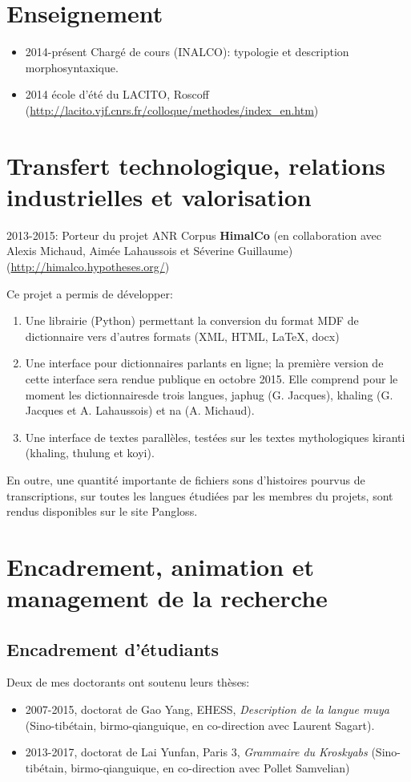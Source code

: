 \documentclass[oldfontcommands,oneside,a4paper,11pt]{article}
\begin{document}
\section{Enseignement}
\begin{itemize}
\item 2014-présent Chargé de cours (INALCO): typologie et description morphosyntaxique.
\item 2014 école d'été du LACITO, Roscoff (\url{http://lacito.vjf.cnrs.fr/colloque/methodes/index\_en.htm})
\end{itemize}

\section{Transfert technologique, relations industrielles et valorisation}
2013-2015: Porteur du projet ANR Corpus \textbf{HimalCo} (en collaboration avec Alexis Michaud, Aimée Lahaussois et Séverine Guillaume) (\url{http://himalco.hypotheses.org/})

Ce projet a permis de développer:

\begin{enumerate}
\item Une librairie (Python) permettant la conversion du format MDF de dictionnaire vers d'autres formats (XML, HTML, \LaTeX, docx)
\item Une interface pour dictionnaires parlants en ligne; la première version de cette interface sera rendue publique en octobre 2015. Elle comprend pour le moment les dictionnairesde trois langues, japhug (G. Jacques), khaling (G. Jacques et A. Lahaussois) et na (A. Michaud).
\item Une interface de textes parallèles, testées sur les textes mythologiques kiranti (khaling, thulung et koyi).
\end{enumerate}

En outre, une quantité importante de fichiers sons d'histoires pourvus de transcriptions, sur toutes les langues étudiées par les membres du projets, sont rendus disponibles sur le site Pangloss.

\section{Encadrement, animation et management de la recherche}
\subsection{Encadrement d'étudiants}
Deux de mes doctorants ont soutenu leurs thèses:
\begin{itemize}
\item 2007-2015, doctorat de Gao Yang, EHESS, \textit{Description de la langue muya} (Sino-tibétain, birmo-qianguique, en co-direction avec Laurent Sagart).
\item 2013-2017, doctorat de Lai Yunfan, Paris 3, \textit{Grammaire du Kroskyabs} (Sino-tibétain, birmo-qianguique, en co-direction avec Pollet Samvelian)
\end{itemize}
\end{document}
